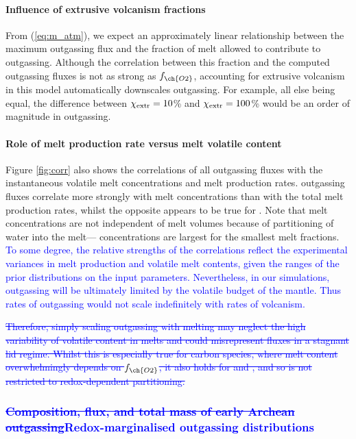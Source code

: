 \documentclass[3p,authoryear]{elsarticle}
\newcommand{\editthree}[2]{\textcolor{blue}{\sout{#1}#2}}
\begin{document}
\paragraph{Influence of extrusive volcanism fractions}

From (\ref{eq:m_atm}), we expect an approximately linear relationship between the maximum outgassing flux and the fraction of melt allowed to contribute to outgassing. Although the correlation between this fraction and the computed outgassing fluxes is not as strong as $f_{\ch{O2}}$, accounting for extrusive volcanism in this model automatically downscales outgassing. For example, all else being equal, the difference between $\chi_{\rm extr}=10$\% and $\chi_{\rm extr}=100$\% would be an order of magnitude in outgassing.


\paragraph{Role of melt production rate versus melt volatile content}

Figure \ref{fig:corr} also shows the correlations of all outgassing fluxes with the instantaneous volatile melt concentrations and melt production rates.  outgassing fluxes correlate more strongly with  melt concentrations than with the total melt production rates, whilst the opposite appears to be true for . Note that  melt concentrations are not independent of melt volumes because of partitioning of water into the melt--- concentrations are largest for the smallest melt fractions. \editthree{}{To some degree, the relative strengths of the correlations reflect the experimental variances in melt production and volatile melt contents, given the ranges of the prior distributions on the input parameters. Nevertheless, in our simulations, outgassing will be ultimately limited by the volatile budget of the mantle. Thus rates of outgassing would not scale indefinitely with rates of volcanism.} 


\editthree{Therefore, simply scaling outgassing with melting may neglect the high variability of volatile content in melts and could misrepresent fluxes in a stagnant lid regime. Whilst this is especially true for carbon species, where melt content overwhelmingly depends on $f_{\ch{O2}}$, it also holds for \ch{H2O} and \ch{H2}, and so is not restricted to redox-dependent partitioning.}{}


\subsubsection{\editthree{Composition, flux, and total mass of early Archean outgassing}{Redox-marginalised outgassing distributions}}
\end{document}
